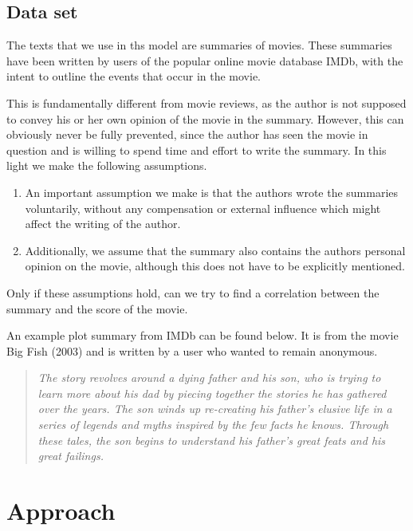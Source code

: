 \documentclass[a4paper,10pt]{article}
\begin{document}
\subsection{Data set}
The texts that we use in ths model are summaries of movies.
These summaries have been written by users of the popular online movie database IMDb, with the intent to outline the events that occur in the movie.

This is fundamentally different from movie reviews, as the author is not supposed to convey his or her own opinion of the movie in the summary.
However, this can obviously never be fully prevented, since the author has seen the movie in question and is willing to spend time and effort to write the summary.
In this light we make the following assumptions.

\begin{enumerate}
  \item An important assumption we make is that the authors wrote the summaries voluntarily, without any compensation or external influence which might affect the writing of the author.
  \item Additionally, we assume that the summary also contains the authors personal opinion on the movie, although this does not have to be explicitly mentioned.
\end{enumerate}
Only if these assumptions hold, can we try to find a correlation between the summary and the score of the movie.

An example plot summary from IMDb can be found below. 
It is from the movie Big Fish (2003) and is written by a user who wanted to remain anonymous.
\begin{quotation}
  \emph{The story revolves around a dying father and his son, who is trying to learn more about his dad by piecing together the stories he has gathered over the years.
  The son winds up re-creating his father's elusive life in a series of legends and myths inspired by the few facts he knows.
  Through these tales, the son begins to understand his father's great feats and his great failings.}
\end{quotation}

\section{Approach}
\end{document}
